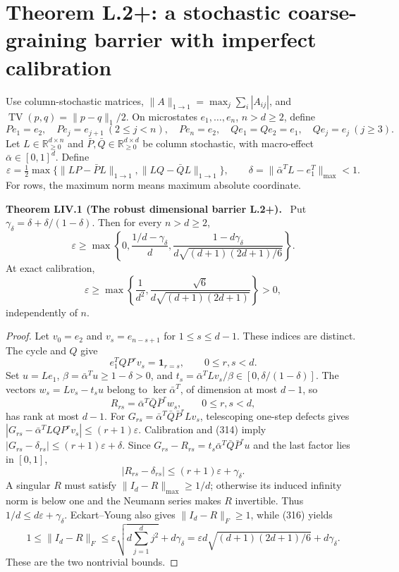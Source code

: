 \documentclass[11pt,a4paper,oneside]{book}
\newcommand{\R}{\mathbb R}\newcommand{\C}{\mathbb C}\newcommand{\Z}{\mathbb Z}\newcommand{\N}{\mathbb N}\newcommand{\Q}{\mathbb Q}
\newcommand{\one}{\mathbf 1}\newcommand{\ii}{\mathrm i}\newcommand{\dd}{\mathrm d}
\newcommand{\statement}[3]{\par\medskip\noindent\textbf{#1 #2 (#3).}\ }
\begin{document}
\section{Theorem L.2+: a stochastic coarse-graining barrier with imperfect calibration}
Use column-stochastic matrices, $\|A\|_{1\to1}=\max_j\sum_i|A_{ij}|$, and $\operatorname{TV}(p,q)=\|p-q\|_1/2$. On microstates $e_1,\ldots,e_n$, $n>d\ge2$, define
\begin{equation}Pe_1=e_2,\quad Pe_j=e_{j+1}\ (2\le j<n),\quad Pe_n=e_2,\quad Qe_1=Qe_2=e_1,\quad Qe_j=e_j\ (j\ge3).\tag{310}\end{equation}
Let $L\in\R_{\ge0}^{d\times n}$ and $\bar P,\bar Q\in\R_{\ge0}^{d\times d}$ be column stochastic, with macro-effect $\bar\alpha\in[0,1]^d$. Define
\begin{equation}\varepsilon=\tfrac12\max\{\|LP-\bar PL\|_{1\to1},\|LQ-\bar QL\|_{1\to1}\},\qquad\delta=\|\bar\alpha^TL-e_1^T\|_{\max}<1.\tag{311}\end{equation}
For rows, the maximum norm means maximum absolute coordinate.
\statement{Theorem}{LIV.1}{The robust dimensional barrier L.2+}
Put $\gamma_\delta=\delta+\delta/(1-\delta)$. Then for every $n>d\ge2$,
\begin{equation}\varepsilon\ge\max\left\{0,\frac{1/d-\gamma_\delta}{d},\frac{1-d\gamma_\delta}{d\sqrt{(d+1)(2d+1)/6}}\right\}.\tag{312}\end{equation}
At exact calibration,
\begin{equation}\varepsilon\ge\max\left\{\frac1{d^2},\frac{\sqrt6}{d\sqrt{(d+1)(2d+1)}}\right\}>0,\tag{313}\end{equation}
independently of $n$.
\begin{proof}
Let $v_0=e_2$ and $v_s=e_{n-s+1}$ for $1\le s\le d-1$. These indices are distinct. The cycle and $Q$ give
\begin{equation}e_1^TQP^rv_s=\one_{r=s},\qquad0\le r,s<d.\tag{314}\end{equation}
Set $u=Le_1$, $\beta=\bar\alpha^Tu\ge1-\delta>0$, and $t_s=\bar\alpha^TLv_s/\beta\in[0,\delta/(1-\delta)]$. The vectors $w_s=Lv_s-t_su$ belong to $\ker\bar\alpha^T$, of dimension at most $d-1$, so
\begin{equation}R_{rs}=\bar\alpha^T\bar Q\bar P^rw_s,\qquad0\le r,s<d,\tag{315}\end{equation}
has rank at most $d-1$. For $G_{rs}=\bar\alpha^T\bar Q\bar P^rLv_s$, telescoping one-step defects gives $|G_{rs}-\bar\alpha^TLQP^rv_s|\le(r+1)\varepsilon$. Calibration and (314) imply $|G_{rs}-\delta_{rs}|\le(r+1)\varepsilon+\delta$. Since $G_{rs}-R_{rs}=t_s\bar\alpha^T\bar Q\bar P^ru$ and the last factor lies in $[0,1]$,
\begin{equation}|R_{rs}-\delta_{rs}|\le(r+1)\varepsilon+\gamma_\delta.\tag{316}\end{equation}
A singular $R$ must satisfy $\|I_d-R\|_{\max}\ge1/d$; otherwise its induced infinity norm is below one and the Neumann series makes $R$ invertible. Thus $1/d\le d\varepsilon+\gamma_\delta$. Eckart--Young also gives $\|I_d-R\|_F\ge1$, while (316) yields
\[1\le\|I_d-R\|_F\le\varepsilon\sqrt{d\sum_{j=1}^dj^2}+d\gamma_\delta=\varepsilon d\sqrt{(d+1)(2d+1)/6}+d\gamma_\delta.\]
These are the two nontrivial bounds.
\end{proof}
\end{document}
